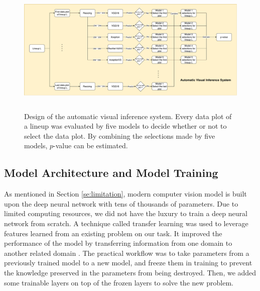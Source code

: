 \documentclass{monashthesis}
\theoremstyle{definition}
\theoremstyle{definition}
\theoremstyle{definition}
\theoremstyle{definition}
\theoremstyle{remark}
\begin{document}
\begin{figure}
\centering
\includegraphics[width=5.72917in,height=2.45833in]{figures/vi_system.pdf}
\caption{Design of the automatic visual inference system. Every data plot of a lineup was evaluated by five models to decide whether or not to select the data plot. By combining the selections made by five models, \(p\)-value can be estimated. \label{fig:system-design}}
\end{figure}

\hypertarget{model-architecture-and-model-training}{%
\subsection{Model Architecture and Model Training}\label{model-architecture-and-model-training}}

As mentioned in Section \ref{se:limitation}, modern computer vision model is built upon the deep neural network with tens of thousands of parameters. Due to limited computing resources, we did not have the luxury to train a deep neural network from scratch. A technique called transfer learning was used to leverage features learned from an existing problem on our task. It improved the performance of the model by transferring information from one domain to another related domain \autocite{weiss_survey_2016}. The practical workflow was to take parameters from a previously trained model to a new model, and freeze them in training to prevent the knowledge preserved in the parameters from being destroyed. Then, we added some trainable layers on top of the frozen layers to solve the new problem.
\end{document}
